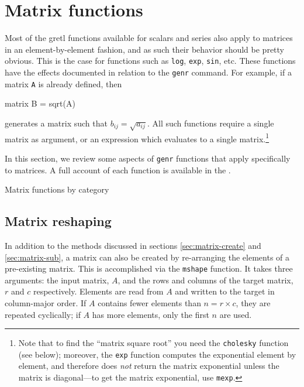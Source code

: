 \section{Matrix functions}
\label{sec:matrix-func}

Most of the gretl functions available for scalars and series
also apply to matrices in an element-by-element fashion, and as such
their behavior should be pretty obvious. This is the case for
functions such as \texttt{log}, \texttt{exp}, \texttt{sin}, etc.
These functions have the effects documented in relation to the
\texttt{genr} command.  For example, if a matrix \texttt{A} is already
defined, then
%
\begin{code}
matrix B = sqrt(A)
\end{code}
%
generates a matrix such that $b_{ij} = \sqrt{a_{ij}}$.  All such
functions require a single matrix as argument, or an expression which
evaluates to a single matrix.\footnote{Note that to find the ``matrix
  square root'' you need the \texttt{cholesky} function (see below);
  moreover, the \texttt{exp} function computes the exponential element
  by element, and therefore does \emph{not} return the matrix
  exponential unless the matrix is diagonal---to get the matrix
  exponential, use \texttt{mexp}.}

In this section, we review some aspects of \texttt{genr} functions that
apply specifically to matrices. A full account of each function is
available in the \GCR.

\newlength{\cwid}
\setlength{\cwid}{0.1\textwidth}

\begin{table}[htbp]
\centering

\caption{Matrix functions by category}
\label{tab:matrix_funcs_cat}
\end{table}

\subsection{Matrix reshaping}
\label{matrix-mshape}

In addition to the methods discussed in sections
\ref{sec:matrix-create} and \ref{sec:matrix-sub}, a matrix can also be
created by re-arranging the elements of a pre-existing matrix. This is
accomplished via the \texttt{mshape} function. It takes three
arguments: the input matrix, $A$, and the rows and columns of the
target matrix, $r$ and $c$ respectively.  Elements are read from $A$
and written to the target in column-major order.  If $A$ contains
fewer elements than $n = r \times c$, they are repeated cyclically; if
$A$ has more elements, only the first $n$ are used.

